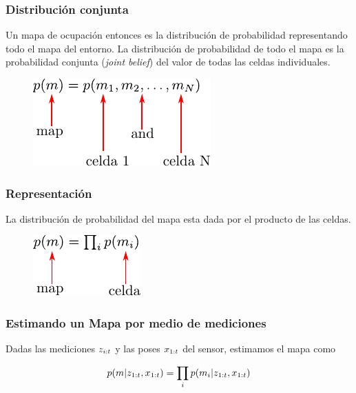 \begin{frame}
    \frametitle{Distribución conjunta}
    
    Un mapa de ocupación entonces es la distribución de probabilidad representando todo el mapa del entorno. La distribución de probabilidad de todo el mapa es la probabilidad conjunta (\emph{joint belief}) del valor de todas las celdas individuales.
    
   	\begin{figure}[!h]
    	\includegraphics[width=0.5\columnwidth]{./images/joint_distribution.pdf}
    \end{figure}
    
\end{frame}

\begin{frame}
    \frametitle{Representación}
    La distribución de probabilidad del mapa esta dada por el producto de las celdas.
    
   	\begin{figure}[!h]
    	\includegraphics[width=0.3\columnwidth]{./images/map_probability_distribution.pdf}
    \end{figure}
    
\end{frame}

\begin{frame}
	\frametitle{Estimando un Mapa por medio de mediciones}
	
	Dadas las mediciones $z_{i:t}$ y las poses $x_{1:t}$ del sensor, estimamos el mapa como
	
	\begin{equation*}
		p(m | z_{1:t}, x_{1:t}) = \prod_{i} p(m_{i} | z_{1:t}, x_{1:t})
	\end{equation*}
	
\end{frame}
